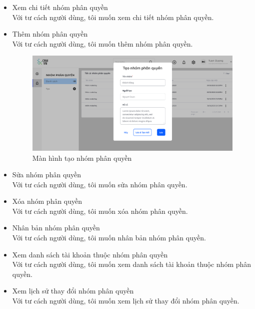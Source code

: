 \documentclass[12pt,a4paper]{article}
\begin{document}
\begin{enumerate}
\begin{itemize}
            \item Xem chi tiết nhóm phân quyền \\
            Với tư cách người dùng, tôi muốn xem chi tiết nhóm phân quyền.

            \item Thêm nhóm phân quyền \\
            Với tư cách người dùng, tôi muốn thêm nhóm phân quyền.

            \begin{figure}[H]
                \centering \includegraphics[width=\textwidth]{Img/Nguyet/NhomPhanQuyen/taonpq.png}
                \vspace{0.5cm}
                \caption{Màn hình tạo nhóm phân quyền}
                \label{taonpqxx}
            \end{figure}

            \item Sửa nhóm phân quyền \\
            Với tư cách người dùng, tôi muốn sửa nhóm phân quyền.

            \item Xóa nhóm phân quyền\\
            Với tư cách người dùng, tôi muốn xóa nhóm phân quyền.

            \item Nhân bản nhóm phân quyền \\
            Với tư cách người dùng, tôi muốn nhân bản nhóm phân quyền.

            \item Xem danh sách tài khoản thuộc nhóm phân quyền\\
            Với tư cách người dùng, tôi muốn xem danh sách tài khoản thuộc nhóm phân quyền.

            \item Xem lịch sử thay đổi nhóm phân quyền\\
            Với tư cách người dùng, tôi muốn xem lịch sử thay đổi nhóm phân quyền.
        \end{itemize}
    \end{enumerate}
    \newpage
\end{document}
